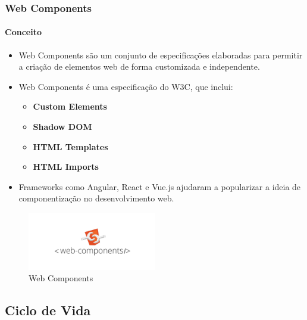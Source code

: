 \documentclass[
	9pt, %
	t, %
]{beamer}
\begin{document}
\begin{frame}
	\frametitle{Web Components}
	\framesubtitle{Conceito}
	\begin{itemize}
		\item Web Components são um conjunto de especificações elaboradas para permitir a
		      criação de elementos web de forma customizada e independente.
		\item Web Components é uma especificação do W3C, que inclui:
		      \begin{itemize}
			      \item \textbf{Custom Elements}
			      \item \textbf{Shadow DOM}
			      \item \textbf{HTML Templates}
			      \item \textbf{HTML Imports}
		      \end{itemize}
		\item Frameworks como Angular, React e Vue.js ajudaram a popularizar a ideia de
		      componentização no desenvolvimento web.
	\end{itemize}

	\begin{figure}
		\centering
		\includegraphics[width=0.5\textwidth]{web_components.jpg}
		\caption{Web Components}
	\end{figure}

\end{frame}

\subsection{Ciclo de Vida}
\end{document}
